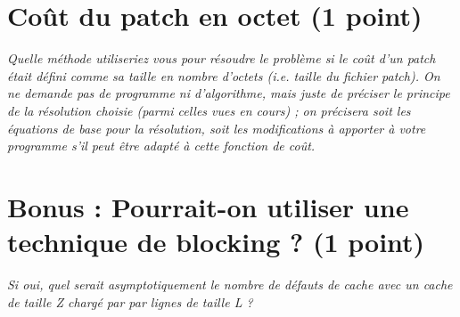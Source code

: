 \documentclass[a4paper,10pt,french]{article}
\begin{document}
\section{Coût du patch en octet (1 point)}
  {\em Quelle méthode utiliseriez vous pour résoudre le problème si le coût d’un patch était défini comme
sa taille en nombre d’octets (i.e. taille du fichier patch).
On ne demande pas de programme ni d’algorithme, mais juste de préciser le principe de la résolution
choisie (parmi celles vues en cours) ; on précisera soit les équations de base pour la résolution, soit
les modifications à apporter à votre programme s’il peut être adapté à cette fonction de coût.
  }
\section{Bonus : Pourrait-on utiliser une technique de blocking ? (1 point)}
{\em
Si oui, quel serait asymptotiquement le nombre de défauts de
cache avec un cache de taille Z chargé par par lignes de taille L ?
}
\end{document}
